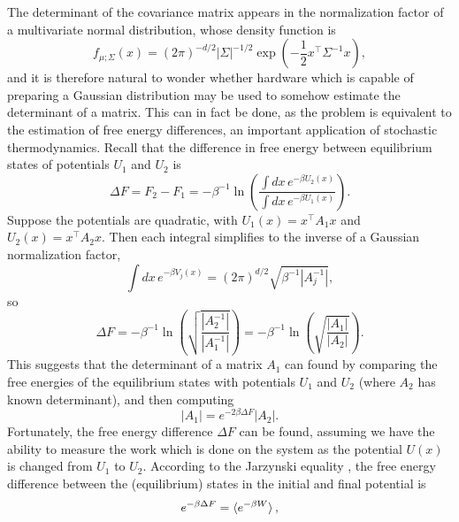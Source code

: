 \documentclass[prx,onecolumn,floatfix,longbibliography,notitlepage, nofootinbib]{revtex4-1}
\begin{document}
The determinant of the covariance matrix appears in the normalization factor of a multivariate normal distribution, whose density function is
\begin{equation}
    f_{\mu;\Sigma}(x) = (2 \pi)^{-d/2}\left| \Sigma\right|^{-1/2}
    \exp \left(-\frac{1}{2} x^\intercal \Sigma^{-1} x \right),
\end{equation}
and it is therefore natural to wonder whether hardware which is capable of preparing a Gaussian distribution may be used to somehow estimate the determinant of a matrix. This can in fact be done, as the problem is equivalent to the estimation of free energy differences, an important application of stochastic thermodynamics. Recall that the difference in free energy between equilibrium states of potentials $U_1$ and $U_2$ is \cite{christ2010basic}
\begin{equation}
    \Delta F = F_2 - F_1 = -\beta^{-1} \ln \left(\frac{\int dx \, e^{-\beta U_2(x)}}{\int dx \, e^{-\beta U_1(x)}}\right).
\end{equation}
Suppose the potentials are quadratic, with $U_1(x) = x^\intercal A_1 x$ and $U_2(x) = x^\intercal A_2 x$. Then each integral simplifies to the inverse of a Gaussian normalization factor,
\begin{equation}
    \int dx\,  e^{-\beta V_j(x)} = (2\pi)^{d/2}\sqrt{\beta^{-1}\left|A_j^{-1} \right|},
\end{equation}
so
\begin{equation}
    \Delta F = -\beta^{-1} \ln \left(\sqrt{\frac{\left| A_2^{-1}\right|}{\left| A_1^{-1}\right|}}\right) = -\beta^{-1} \ln \left(\sqrt{\frac{\left| A_1\right|}{\left| A_2\right|}}\right).
\end{equation}
This suggests that the determinant of a matrix $A_1$ can found by comparing the free energies of the equilibrium states with potentials $U_1$ and $U_2$ (where $A_2$ has known determinant), and then computing
\begin{equation}
    \left| A_1\right| = e^{-2 \beta \Delta F} \left| A_2\right|.
\end{equation}
Fortunately, the free energy difference $\Delta F$ can be found, assuming we have the ability to measure the work which is done on the system as the potential $U(x)$ is changed from $U_1$ to $U_2$. According to the Jarzynski equality \cite{jarzynski1997nonequilibrium}, the free energy difference between the (equilibrium) states in the initial and final potential is
\begin{equation}
    e^{-\beta \Delta F} = \braket{e^{-\beta W}},
\end{equation}
\end{document}
